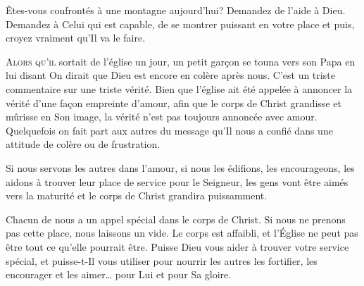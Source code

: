 Êtes-vous confrontés à une montagne aujourd'hui? Demandez de l'aide à Dieu.
 Demandez à Celui qui est capable, de se montrer puissant en votre place
 \ocadr et puis, croyez vraiment qu'Il va le faire.

\dvrule






\lettrine{A}{lors qu'il} sortait de l'église un jour,
 un petit gar\c{c}on se touna vers son Papa  en lui disant\frcolon{} 
 \Og On dirait que Dieu est encore en colère après nous. \Fg{}
 C'est un triste commentaire sur une triste vérité.
 Bien que l'église ait été appelée à annoncer la vérité
 d'une fa\c{c}on empreinte d'amour, afin que le corps de Christ grandisse
 et mûrisse en Son image, la vérité n'est pas toujours annoncée avec amour.
 Quelquefois  on fait part aux autres du message
 qu'Il nous a confié dans une attitude de colère ou de frustration. 


Si nous servons les autres dans l'amour, si nous les édifions,
 les encourageons, les aidons à trouver leur place de service
 pour le Seigneur, les gens vont être aimés vers la maturité
 \ocadr et le corps de Christ grandira puissamment.

Chacun de nous a un appel spécial dans le corps de Christ.
 Si nous ne prenons pas cette place, nous laissons un vide.
 Le corps est affaibli, et l'Église 
 ne peut pas être tout ce qu'elle pourrait être.
 Puisse Dieu vous aider à trouver votre service spécial,
 et puisse-t-Il vous utiliser pour nourrir les autres
 \ocadr les fortifier, les encourager et les aimer\dots{}
 pour Lui et pour Sa gloire.

\dvrule




